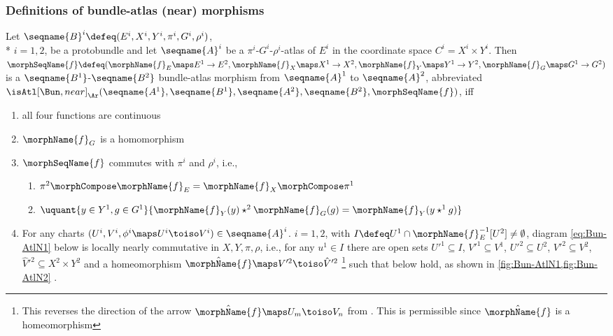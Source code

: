 \documentclass{article}
\begin{document}
\subsubsection{Definitions of bundle-atlas (near) morphisms}
\begin{definition}
\label{def:Bun-ATLmorphnear}
Let
$
  \seqname{B}^i
  \defeq
  (
    E^i,
    X^i,
    Y^i,
    \pi^i,
    G^i,
    \rho^i
  )
$, \\*
$i=1,2$,
be a protobundle and let $\seqname{A}^i$ be a
$\pi^i$-$G^i$-$\rho^i$-atlas of $E^i$ in the coordinate space
\nobreaks
{{
  $C^i = X^i \times Y^i$.
}}
Then
$
  \morphSeqName{f}
  \defeq
  (
    \morphName{f}_E \maps E^1 \to E^2,
    \morphName{f}_X \maps X^1 \to X^2,
    \morphName{f}_Y \maps Y^1 \to Y^2,
    \morphName{f}_G \maps G^1 \to G^2
  )
$
is a $\seqname{B^1}$-$\seqname{B^2}$ bundle-atlas morphism from
$\seqname{A}^1$ to $\seqname{A}^2$, abbreviated \\
\nobreaks
{{
  $
    \isAtl[\Bun,near]_\Ar
      (
        \seqname{A^1}, \seqname{B^1},
        \seqname{A^2}, \seqname{B^2},
        \morphSeqName{f}
      )
  $,
}}
iff
\begin{enumerate}
\item all four functions are continuous
\item $\morphName{f}_G$ is a homomorphism
\item $\morphSeqName{f}$ commutes with $\pi^i$ and $\rho^i$, i.e.,
\begin{enumerate}
\item $\pi^2 \morphCompose \morphName{f}_E = \morphName{f}_X \morphCompose \pi^1$
\item
$
  \uquant
    {{y \in Y^1},{g \in G^1}}
    {{
      \morphName{f}_Y(y) \star^2 \morphName{f}_G(g) =
      \morphName{f}_Y(y \star^1 g)
    }}
$
\end{enumerate}
\item For any charts
$(U^i, V^i, \phi^i \maps U^i \toiso V^i) \in \seqname{A}^i$. $i=1,2$,
with $I \defeq U^1 \cap \morphName{f}^{-1}_E[U^2] \neq \emptyset$,
diagram \eqref{eq:Bun-AtlN1} below
is locally nearly commutative in $X,Y,\pi,\rho$, i.e., for any
$u^1 \in I$ there are open sets $U'^1 \subseteq I$,
$V'^1 \subseteq V^1$, $U'^2 \subseteq U^2$, $V'^2 \subseteq V^2$,
$\hat{V}'^2 \subseteq X^2 \times Y^2$ and a homeomorphism
$\hat{\morphName{f}} \maps V'^2 \toiso \hat{V}'^2$%
\footnote
{
  This reverses the direction of the arrow
  $\hat{\morphName{f}} \maps U_m \toiso V_n$ from
  .
  This is permissible since $\hat{\morphName{f}}$ is a homeomorphism
}
such that  below hold, as
shown in
{
  \showlabelsinline
  \cref{fig:Bun-AtlN1,fig:Bun-AtlN2}
}.


\end{enumerate}
\end{definition}
\end{document}
